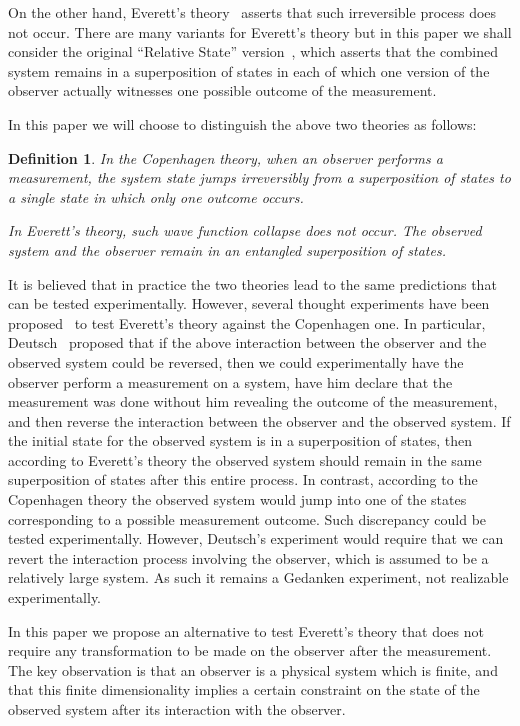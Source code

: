 \documentclass[11pt,amsmath,amssymb,latexsym,a4paper]{article}
\newtheorem{myDefinition}{Definition}
\newcommand{\highlight}[1] {#1}
\begin{document}
On the other hand, Everett's theory~\cite{Everett} asserts that such irreversible process does not occur. There are many variants for Everett's theory but in this paper we shall consider the original ``Relative State'' version~\cite{Everett}, which asserts that the combined system remains in a superposition of states in each of which one version of the observer actually witnesses one possible outcome of the measurement. 

\highlight{In this paper we will choose to} distinguish the above two theories as follows:

\begin{myDefinition} In the Copenhagen theory, when an observer performs a measurement, the system state jumps irreversibly from a superposition of states to a single state in which only one outcome occurs.

In Everett's theory, such wave function collapse does not occur. The observed system and the observer remain in an entangled superposition of states.
\end{myDefinition}

It is believed that in practice the two theories lead to the same predictions that can be tested experimentally. However, several thought experiments have been proposed~\cite{Deutsch, Lockwood, Vaidman} to test Everett's theory against the Copenhagen one. In particular, Deutsch~\cite{Deutsch} proposed that if the above interaction between the observer and the observed system could be reversed, then we could experimentally have the observer perform a measurement on a system, have him declare that the measurement was done without him revealing the outcome of the measurement, and then reverse the interaction between the observer and the observed system. If the initial state for the observed system is in a superposition of states, then according to Everett's theory the observed system should remain in the same superposition of states after this entire process. In contrast, according to the Copenhagen theory the observed system would jump into one of the states corresponding to a possible measurement outcome. Such discrepancy could be tested experimentally. However, Deutsch's experiment would require that we can revert the interaction process involving the observer, which is assumed to be a relatively large system.  As such it remains a Gedanken experiment, not realizable experimentally.


In this paper we propose an alternative to test Everett's theory that does not require any transformation to be made on the observer after the measurement. The key observation is that an observer is a physical system which is finite, and that this finite dimensionality implies a certain constraint on the state of the observed system after its interaction with the observer. 
\end{document}
